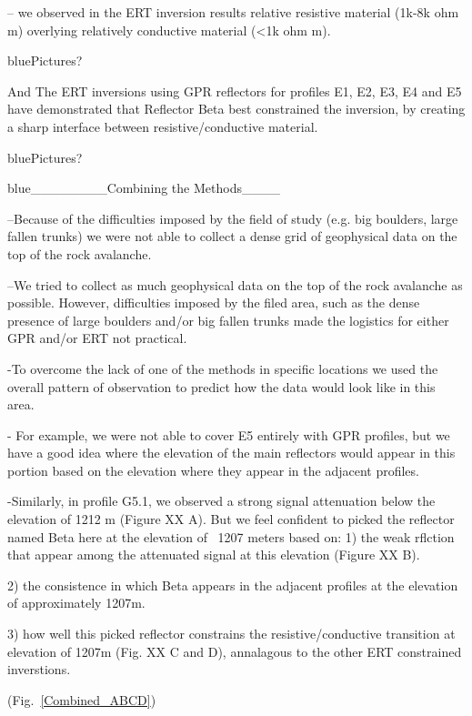 \documentclass[5p]{elsarticle}
\newcommand{\COMON}{\begin{color}{blue}}
\newcommand{\COMOFF}{\end{color}}
\begin{document}
– we observed  in the ERT inversion results relative resistive material (1k-8k ohm m) overlying relatively conductive material (<1k ohm m).

\COMON Pictures? \COMOFF

And The ERT inversions using GPR reflectors for profiles E1, E2, E3, E4 and E5 have demonstrated that Reflector Beta best constrained the inversion, by creating a sharp interface between resistive/conductive material.


\COMON Pictures? \COMOFF


\COMON ________Combining the Methods____ \COMOFF


--Because of the difficulties imposed by the field of study (e.g. big boulders,  large fallen trunks) we were not able to collect a dense grid of geophysical data on the top of the rock avalanche. 

--We tried to collect as much geophysical data on the top of the rock avalanche as possible. However, difficulties imposed by the filed area, such as the dense presence of large boulders and/or big fallen trunks made the logistics for either GPR and/or ERT not practical. 

-To overcome the lack of one of the methods in specific locations we used the overall pattern of observation to predict how the data would look like in this area. 

- For example, we were not able to cover E5 entirely with GPR profiles, but we have a good idea where the elevation of the main reflectors would appear in this portion based on the elevation where they appear in the adjacent profiles.

-Similarly, in profile G5.1, we observed a strong signal attenuation below the elevation of 1212 m (Figure XX A). But we feel confident to picked the reflector named Beta here at the elevation of ~1207 meters based on: 
1) the weak rflction that appear among the attenuated signal at this elevation (Figure XX B).

2) the consistence in which Beta appears in the adjacent profiles at the elevation of approximately 1207m.

3) how well this picked reflector constrains the resistive/conductive transition at elevation of 1207m (Fig. XX C and D), annalagous to the other ERT constrained inverstions. 
								   
				(Fig.~\ref{Combined_ABCD})			
\end{document}
